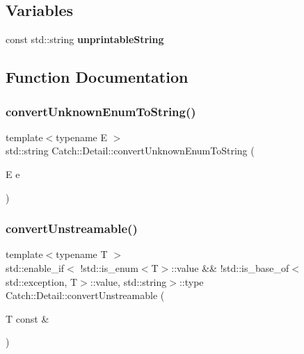 \subsection*{Variables}
\begin{DoxyCompactItemize}
\item 
const std\+::string \textbf{ unprintable\+String}
\end{DoxyCompactItemize}


\subsection{Function Documentation}
\mbox{\label{namespace_catch_1_1_detail_a242396de537c5176710d680cc9ca6b93}} 
\subsubsection{convertUnknownEnumToString()}
{\footnotesize\ttfamily template$<$typename E $>$ \\
std\+::string Catch\+::\+Detail\+::convert\+Unknown\+Enum\+To\+String (\begin{DoxyParamCaption}\item[{E}]{e }\end{DoxyParamCaption})}

\mbox{\label{namespace_catch_1_1_detail_a8e765acd7fc9eabdc34c786014cf02cd}} 
\subsubsection{convertUnstreamable()\hspace{0.1cm}{\footnotesize\ttfamily [1/3]}}
{\footnotesize\ttfamily template$<$typename T $>$ \\
std\+::enable\+\_\+if$<$ !std\+::is\+\_\+enum$<$T$>$\+::value \&\& !std\+::is\+\_\+base\+\_\+of$<$std\+::exception, T$>$\+::value, std\+::string$>$\+::type Catch\+::\+Detail\+::convert\+Unstreamable (\begin{DoxyParamCaption}\item[{T const \&}]{ }\end{DoxyParamCaption})}

\mbox{\label{namespace_catch_1_1_detail_aa5db7cae49c34a5e656be39ea52dbe22}} 
